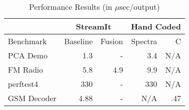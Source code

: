 \begin{table}[t]
\begin{center}
\scriptsize
\begin{tabular}{|l|r|r|r|r|} \hline
& \multicolumn{2}{|c|}{StreamIt} &  \multicolumn{2}{|c|}{Hand Coded}\\
\hline 
Benchmark & Baseline & Fusion & Spectra & C \\
\hline \hline
PCA Demo & 1.3 & - & 3.4 & N/A\\
\hline
FM Radio & 5.8 & 4.9 & 9.9 & N/A\\
\hline
perftest4 & 330 & - & 330 & N/A\\
\hline
GSM Decoder & 4.88 & - & N/A & .47\\
\hline
\end{tabular}
\vspace{-6pt}
\caption{\protect\small Performance Results (in $\mu$sec/output)}
\label{tab:performance}
\vspace{-12pt}
\end{center}
\end{table}